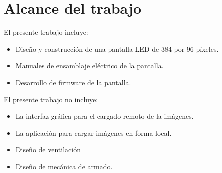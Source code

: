 \pagebreak

\section{Alcance del trabajo}
El presente trabajo incluye:

\begin{itemize}
\item Diseño y construcción de una pantalla LED de 384 por 96 píxeles.
\item Manuales de ensamblaje eléctrico de la pantalla.
\item Desarrollo de firmware de la pantalla.


\end{itemize}

El presente trabajo no incluye:

 \begin{itemize}
\item La interfaz gráfica para el cargado remoto de la imágenes.
\item La aplicación para cargar imágenes en forma local.
\item Diseño de ventilación 
\item Diseño de mecánica de armado.

\end{itemize}




